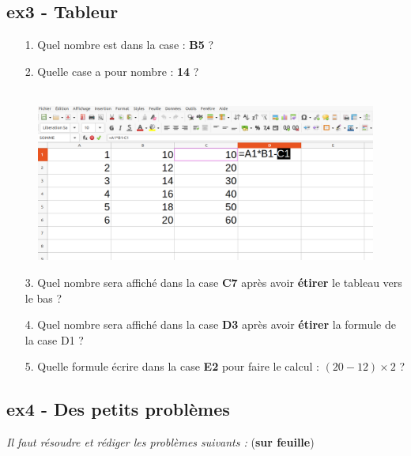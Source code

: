 \documentclass[11pt]{article}
\begin{document}
\begin{minipage}[t]{0.45\textwidth}
  \subsection*{ex3 - Tableur}

  \begin{enumerate}
    \item[1.] Quel nombre est dans la case : \textbf{B5} ? \dotfill
    \item[2.] Quelle case a pour nombre : \textbf{14} ? \dotfill
  \end{enumerate}

\end{minipage}
\begin{minipage}[t]{0.5\textwidth}

  \begin{figure}[H]
        \centering
        \includegraphics[width=\linewidth]{4x2-proportionnalite/ie-tableur.png}
  \end{figure}

\end{minipage}

\begin{enumerate}
  \item[3.] Quel nombre sera affiché dans la case \textbf{C7} après avoir \textbf{étirer} le tableau vers le bas ? \dotfill
  \item[4.] Quel nombre sera affiché dans la case \textbf{D3} après avoir \textbf{étirer} la formule de la case D1 ? \dotfill
  \item[5.] Quelle formule écrire dans la case \textbf{E2} pour faire le calcul : $(20-12) \times 2$ ? \dotfill
\end{enumerate}

\newpage

\subsection*{ex4 - Des petits problèmes}
\textit{Il faut résoudre et rédiger les problèmes suivants :} (\textbf{sur feuille})
\end{document}
